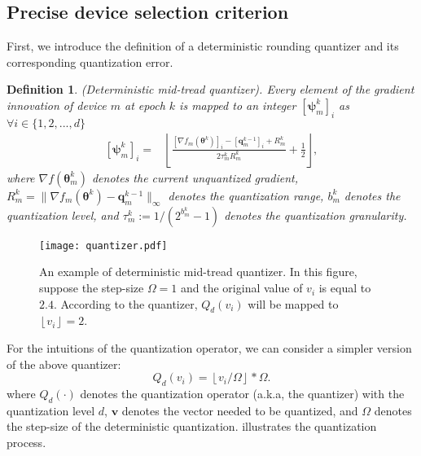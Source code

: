 \documentclass[lettersize,journal]{IEEEtran}
\newtheorem{definition}{Definition}
\begin{document}
\subsection{Precise device selection criterion}
\label{precise_skip}

First, we introduce the definition of a deterministic rounding quantizer and its corresponding quantization error.

\begin{definition}
(Deterministic mid-tread quantizer). \textit{Every element of the gradient innovation of device $m$ at epoch $k$ is mapped to an integer $[{\boldsymbol{\psi}}_{m}^{k}]_i$ as $\forall i \in \{1,2,...,d\}$ }
\begin{equation}
\begin{aligned}
\label{psi_q}
\left[{\boldsymbol{\psi}}_{m}^{k}\right]_i=&\left\lfloor\frac{\left[\nabla f_m(\boldsymbol{\theta}^k)\right]_i-\left[\boldsymbol{q}_{m}^{k-1}\right]_i+R_m^k}{2 \tau_m^k R_m^k}\!+\!\frac{1}{2}\right\rfloor,
\end{aligned}
\end{equation}
where $\nabla f(\boldsymbol{\theta}_m^k)$ denotes the current unquantized gradient, $R_m^k = \|\nabla f_m(\boldsymbol{\theta}^{k})-\boldsymbol{q}_{m}^{k-1}\|_\infty$ denotes the quantization range, $b_m^k$ denotes the quantization level, and $\tau_m^k:=1 /(2^{b_m^k}-1)$ denotes the quantization granularity.
\end{definition}

\begin{figure}[htb]
    \centering
    \texttt{[image: quantizer.pdf]}
    \caption{An example of deterministic mid-tread quantizer. In this figure, suppose the step-size $\Omega = 1$ and the original value of $v_i$ is equal to $2.4$. According to the quantizer, $Q_d(v_i)$ will be mapped to $\left\lfloor v_i \right\rfloor = 2$.}
    \label{quant_process}
\end{figure}
For the intuitions of the quantization operator, we can consider a simpler version of the above quantizer: 
$$
Q_d\left(v_i\right)=\left\lfloor v_i / \Omega\right\rfloor * \Omega.
$$
where $Q_d(\cdot)$ denotes the quantization operator (a.k.a, the quantizer) with the quantization level $d$, $\boldsymbol{v}$ denotes the vector needed to be quantized, and $\Omega$ denotes the step-size of the deterministic quantization.  illustrates the quantization process.
\end{document}
